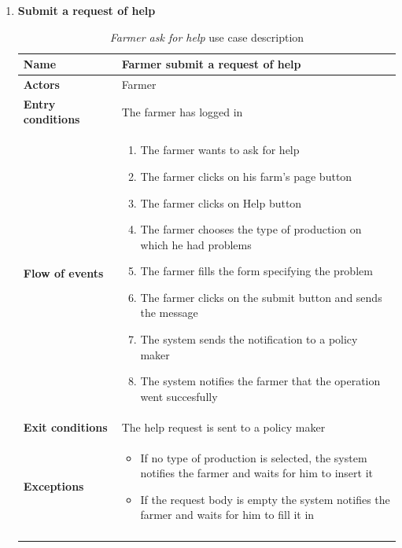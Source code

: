 \begin{enumerate}
    \item \textbf{Submit a request of help}
    \begin{longtable}{p{0.26\linewidth}p{0.75\linewidth}}
        \toprule
        \textbf{Name} & \textbf{Farmer submit a request of help} \\
        \midrule
        \textbf{Actors} & Farmer \\
        \midrule
        \textbf{Entry conditions} & The farmer has logged in\\
        \midrule
        \textbf{Flow of events} & 
        \begin{enumerate}
            \item The farmer wants to ask for help
            \item The farmer clicks on his farm's page button
            \item The farmer clicks on Help button
            \item The farmer chooses the type of production on which he had problems
            \item The farmer fills the form specifying the problem
            \item The farmer clicks on the submit button and sends the message
            \item The system sends the notification to a policy maker
            \item The system notifies the farmer that the operation went succesfully
        \end{enumerate} \\
        \midrule
        \textbf{Exit conditions} & The help request is sent to a policy maker\\
        \midrule
        \textbf{Exceptions} & 
        \begin{itemize}
            \item If no type of production is selected, the system notifies the farmer and waits for him to insert it
            \item If the request body is empty the system notifies the farmer and waits for him to fill it in
        \end{itemize}\\
        \bottomrule
        \caption{\emph{Farmer ask for help} use case description}
    \end{longtable}


\end{enumerate}
